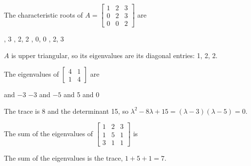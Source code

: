 \begin{question}[id=gate-me2000-1, source=GATE ME 2000]
The characteristic roots of $A = \begin{bmatrix} 1 & 2 & 3 \\ 0 & 2 & 3 \\ 0 & 0 & 2 \end{bmatrix}$ are
\begin{options}
  , 3
  , 2, 2
  , 0, 0
  , 2, 3
\end{options}
\begin{solution}
$A$ is upper triangular, so its eigenvalues are its diagonal entries: 1, 2, 2.
\end{solution}
\end{question}

\begin{question}[id=gate-me2003-2, source=GATE ME 2003]
The eigenvalues of $\begin{bmatrix} 4 & 1 \\ 1 & 4 \end{bmatrix}$ are
\begin{options}
   and $-3$
  \option $-3$ and $-5$
   and 5
   and 0
\end{options}
\begin{solution}
The trace is 8 and the determinant 15, so $\lambda^2 - 8\lambda + 15 = (\lambda - 3)(\lambda - 5) = 0$.
\end{solution}
\end{question}

\begin{question}[id=gate-me2004-2, source=GATE ME 2004]
The sum of the eigenvalues of $\begin{bmatrix} 1 & 2 & 3 \\ 1 & 5 & 1 \\ 3 & 1 & 1 \end{bmatrix}$ is
\begin{options}
\end{options}
\begin{solution}
The sum of the eigenvalues is the trace, $1 + 5 + 1 = 7$.
\end{solution}
\end{question}

